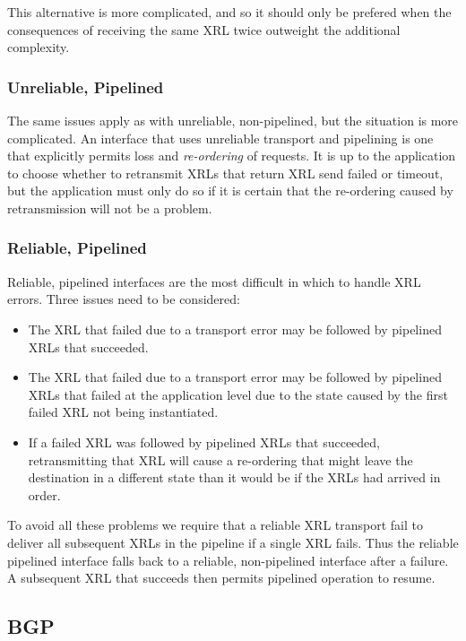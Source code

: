 \documentclass[11pt]{article}
\begin{document}
This alternative is more complicated, and so it should only be
prefered when the consequences of receiving the same XRL twice
outweight the additional complexity.

\subsubsection*{Unreliable, Pipelined}

The same issues apply as with unreliable, non-pipelined, but the
situation is more complicated.  An interface that uses unreliable
transport and pipelining is one that explicitly permits loss and {\em
re-ordering} of requests.  It is up to the application to choose
whether to retransmit XRLs that return XRL send failed or timeout, but
the application must only do so if it is certain that the re-ordering
caused by retransmission will not be a problem.

\subsubsection*{Reliable, Pipelined}

Reliable, pipelined interfaces are the most difficult in which to
handle XRL errors.  Three issues need to be considered:
\begin{itemize}
\item The XRL that failed due to a transport error may be followed by
pipelined XRLs that succeeded.
\item The XRL that failed due to a transport error may be followed by
pipelined XRLs that failed at the application level due to the state
caused by the first failed XRL not being instantiated.
\item If a failed XRL was followed by pipelined XRLs that succeeded,
retransmitting that XRL will cause a re-ordering that might leave the
destination in a different state than it would be if the XRLs had
arrived in order.
\end{itemize}
To avoid all these problems we require that a reliable XRL transport
fail to deliver all subsequent XRLs in the pipeline if a single XRL
fails.  Thus the reliable pipelined interface falls back to a
reliable, non-pipelined interface after a failure.  A subsequent XRL
that succeeds then permits pipelined operation to resume.

\subsection{BGP}
\end{document}
